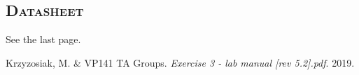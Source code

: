 \documentclass[a4paper,12pt]{article}
\begin{document}
\begin{appendices}
      \section{\textsc{Datasheet}} 
      See the last page.
  \end{appendices} 


\begin{thebibliography}{9}
 Krzyzosiak, M. \& VP141 TA Groups.
\textit{Exercise 3 - lab manual [rev 5.2].pdf}. 
2019.
\end{thebibliography}


\end{document}
